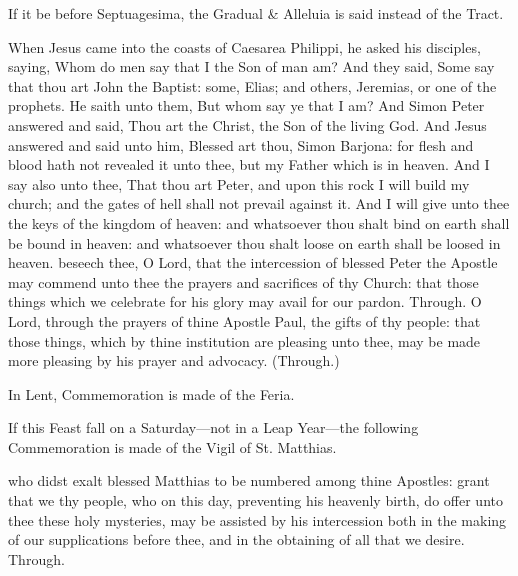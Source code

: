 
\begin{rubric}
    If it be before Septuagesima, the Gradual \& Alleluia is said instead of the Tract.
\end{rubric}


 When Jesus came into the coasts of Caesarea Philippi, he asked his disciples, saying, Whom do men say that I the Son of man am? And they said, Some say that thou art John the Baptist: some, Elias; and others, Jeremias, or one of the prophets. He saith unto them, But whom say ye that I am? And Simon Peter answered and said, Thou art the Christ, the Son of the living God. And Jesus answered and said unto him, Blessed art thou, Simon Barjona: for flesh and blood hath not revealed it unto thee, but my Father which is in heaven. And I say also unto thee, That thou art Peter, and upon this rock I will build my church; and the gates of hell shall not prevail against it. And I will give unto thee the keys of the kingdom of heaven: and whatsoever thou shalt bind on earth shall be bound in heaven: and whatsoever thou shalt loose on earth shall be loosed in heaven.
\secret
{} beseech thee, O Lord, that the intercession of blessed Peter the Apostle may commend unto thee the prayers and sacrifices of thy Church: that those things which we celebrate for his glory may avail for our pardon. Through.
 O Lord, through the prayers of thine Apostle Paul, the gifts of thy people: that those things, which by thine institution are pleasing unto thee, may be made more pleasing by his prayer and advocacy. (Through.)
\begin{rubric}
    In Lent, Commemoration is made of the Feria.%
\end{rubric}
\begin{rubric}
    If this Feast fall on a Saturday---not in a Leap Year---the following Commemoration is made of the Vigil of St. Matthias.
\end{rubric}
 who didst exalt blessed Matthias to be numbered among thine Apostles: grant that we thy people, who on this day, preventing his heavenly birth, do offer unto thee these holy mysteries, may be assisted by his intercession both in the making of our supplications before thee, and in the obtaining of all that we desire. Through.

